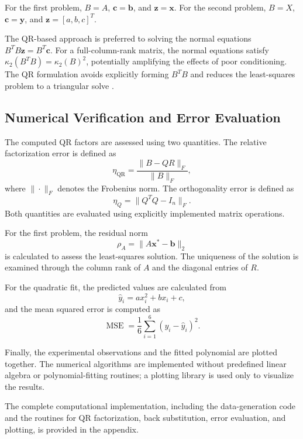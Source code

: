 For the first problem, $B=A$, $\mathbf{c}=\mathbf{b}$, and
$\mathbf{z}=\mathbf{x}$. For the second problem, $B=X$,
$\mathbf{c}=\mathbf{y}$, and $\mathbf{z}=[a,b,c]^T$.

The QR-based approach is preferred to solving the normal equations
$B^TB\mathbf{z}=B^T\mathbf{c}$. For a full-column-rank matrix, the
normal equations satisfy
$\kappa_2(B^TB)=\kappa_2(B)^2$, potentially amplifying the effects
of poor conditioning. The QR formulation avoids explicitly forming
$B^TB$ and reduces the least-squares problem to a triangular solve
\cite{golub2013matrix,higham2002accuracy}.

\subsection{Numerical Verification and Error Evaluation}

The computed QR factors are assessed using two quantities. The
relative factorization error is defined as
\begin{equation}
    \eta_{\mathrm{QR}}
    =
    \frac{\|B-QR\|_F}{\|B\|_F},
    \label{eq:qr-error}
\end{equation}
where $\|\cdot\|_F$ denotes the Frobenius norm. The orthogonality
error is defined as
\begin{equation}
    \eta_Q=\|Q^TQ-I_n\|_F.
    \label{eq:orthogonality-error}
\end{equation}
Both quantities are evaluated using explicitly implemented matrix
operations.

For the first problem, the residual norm
\begin{equation}
    \rho_A=\|A\mathbf{x}^{*}-\mathbf{b}\|_2
    \label{eq:linear-residual}
\end{equation}
is calculated to assess the least-squares solution. The uniqueness
of the solution is examined through the column rank of $A$ and the
diagonal entries of $R$.

For the quadratic fit, the predicted values are calculated from
\begin{equation}
    \widehat{y}_i=ax_i^2+bx_i+c,
\end{equation}
and the mean squared error is computed as
\begin{equation}
    \operatorname{MSE}
    =\frac{1}{6}\sum_{i=1}^{6}(y_i-\widehat{y}_i)^2.
\end{equation}

Finally, the experimental observations and the fitted polynomial
are plotted together. The numerical algorithms are implemented
without predefined linear algebra or polynomial-fitting routines;
a plotting library is used only to visualize the results.

The complete computational implementation, including the
data-generation code and the routines for QR factorization,
back substitution, error evaluation, and plotting, is provided
in the appendix.